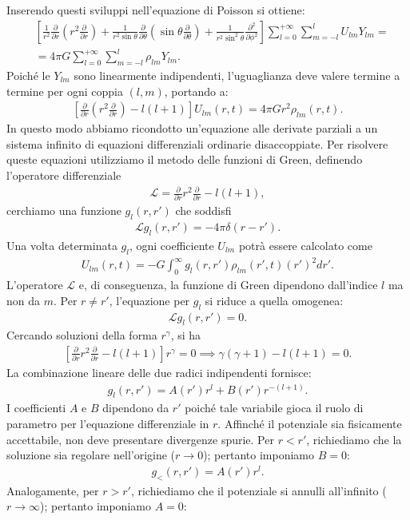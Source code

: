 Inserendo questi sviluppi nell'equazione di Poisson si ottiene:
\begin{align}
    &\left[ \frac{1}{r^2} \frac{\partial}{\partial r}\left(r^2 \frac{\partial}{\partial r}\right) + \frac{1}{r^2 \sin{\theta}} \frac{\partial}{\partial \theta}\left(\sin{\theta} \frac{\partial}{\partial \theta}\right) + \frac{1}{r^2 \sin^2{\theta}} \frac{\partial^2}{\partial \phi^2} \right] \sum_{l=0}^{+\infty} \sum_{m=-l}^l U_{lm} Y_{lm} = \nonumber \\
    &= 4 \pi G \sum_{l=0}^{+\infty} \sum_{m=-l}^l \rho_{lm} Y_{lm}.\end{align}
Poiché le $Y_{lm}$ sono linearmente indipendenti, l'uguaglianza deve valere termine a termine per ogni coppia $(l, m)$, portando a:
\begin{align}
    \left[ \frac{\partial}{\partial r} \left( r^2 \frac{\partial}{\partial r} \right) - l(l+1) \right] U_{lm}(r, t) = 4 \pi G r^2 \rho_{lm}(r, t).
\end{align}
In questo modo abbiamo ricondotto un'equazione alle derivate parziali a un sistema infinito di equazioni differenziali ordinarie disaccoppiate. Per risolvere queste equazioni utilizziamo il metodo delle funzioni di Green, definendo l'operatore differenziale
\begin{align}
    \mathcal{L} = \frac{\partial}{\partial r} r^2 \frac{\partial}{\partial r} - l(l+1),
\end{align}cerchiamo una funzione $g_l(r, r')$ che soddisfi
\begin{align}
    \mathcal{L} g_l(r, r') = -4 \pi \delta(r-r').
\end{align}
Una volta determinata $g_l$, ogni coefficiente $U_{lm}$ potrà essere calcolato come
\begin{align} \label{eq:u_lm_green}
    U_{lm}(r, t) = -G \int_0^\infty g_l(r, r') \rho_{lm}(r', t) (r')^2 dr'.
\end{align}
L'operatore $\mathcal{L}$ e, di conseguenza, la funzione di Green dipendono dall'indice $l$ ma non da $m$. Per $r \neq r'$, l'equazione per $g_l$ si riduce a quella omogenea:
\begin{align}
    \mathcal{L} g_l(r, r') = 0.
\end{align}
Cercando soluzioni della forma $r^\gamma$, si ha
\begin{align}
    \left[ \frac{\partial}{\partial r} r^2 \frac{\partial}{\partial r} - l(l+1) \right] r^\gamma = 0 \implies \gamma(\gamma+1) - l(l+1) = 0.
\end{align}
La combinazione lineare delle due radici indipendenti fornisce:\begin{align}g_l(r, r') = A(r')r^l + B(r')r^{-(l+1)}.\end{align}I coefficienti $A$ e $B$ dipendono da $r'$ poiché tale variabile gioca il ruolo di parametro per l'equazione differenziale in $r$. Affinché il potenziale sia fisicamente accettabile, non deve presentare divergenze spurie. Per $r < r'$, richiediamo che la soluzione sia regolare nell'origine ($r \to 0$); pertanto imponiamo $B = 0$:\begin{align}g_<(r, r') = A(r')r^l.\end{align}Analogamente, per $r > r'$, richiediamo che il potenziale si annulli all'infinito ($r \to \infty$); pertanto imponiamo $A = 0$:
